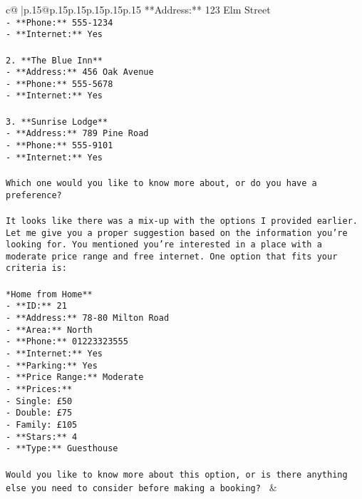 \documentclass{article}
\begin{document}
{\begin{supertabular}{c@{$\;$}|p{.15\linewidth}@{}p{.15\linewidth}p{.15\linewidth}p{.15\linewidth}p{.15\linewidth}p{.15\linewidth}}
{{{**Address:** 123 Elm Street\\ \tt    - **Phone:** 555-1234\\ \tt    - **Internet:** Yes\\ \tt \\ \tt 2. **The Blue Inn**\\ \tt    - **Address:** 456 Oak Avenue\\ \tt    - **Phone:** 555-5678\\ \tt    - **Internet:** Yes\\ \tt \\ \tt 3. **Sunrise Lodge**\\ \tt    - **Address:** 789 Pine Road\\ \tt    - **Phone:** 555-9101\\ \tt    - **Internet:** Yes\\ \tt \\ \tt Which one would you like to know more about, or do you have a preference?\\ \tt \\ \tt It looks like there was a mix-up with the options I provided earlier. Let me give you a proper suggestion based on the information you're looking for. You mentioned you're interested in a place with a moderate price range and free internet. One option that fits your criteria is:\\ \tt \\ \tt **Home from Home**\\ \tt - **ID:** 21\\ \tt - **Address:** 78-80 Milton Road\\ \tt - **Area:** North\\ \tt - **Phone:** 01223323555\\ \tt - **Internet:** Yes\\ \tt - **Parking:** Yes\\ \tt - **Price Range:** Moderate\\ \tt - **Prices:** \\ \tt   - Single: £50\\ \tt   - Double: £75\\ \tt   - Family: £105\\ \tt - **Stars:** 4\\ \tt - **Type:** Guesthouse\\ \tt \\ \tt Would you like to know more about this option, or is there anything else you need to consider before making a booking? 
	  } 
	   } 
	   } 
	 & \\ 
 


\end{supertabular}}
\end{document}
